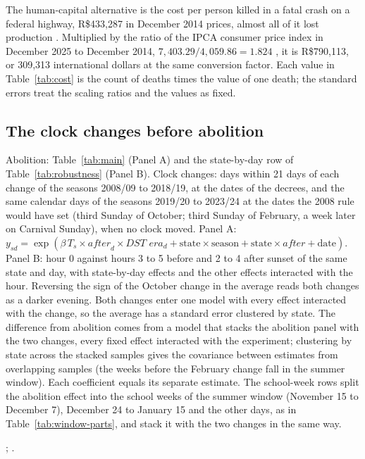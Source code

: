 The human-capital alternative is the cost per person killed in a fatal crash on a federal highway, R\$433,287 in December 2014 prices, almost all of it lost production \citep[Table 6A]{ipea2015acidentes}. Multiplied by the ratio of the IPCA consumer price index in December 2025 to December 2014, $7{,}403.29/4{,}059.86 = 1.824$ \citep{ibge2026ipca}, it is R\$790,113, or 309,313 international dollars at the same conversion factor. Each value in Table~\ref{tab:cost} is the count of deaths times the value of one death; the standard errors treat the scaling ratios and the values as fixed.

\subsection{The clock changes before abolition}

\begin{table}[tbp]
  \caption{The Clock Changes before 2019 and Abolition}
  \label{tab:transitions}
  \centering\footnotesize\renewcommand{\arraystretch}{0.9}
  
  \begin{tablenotes}[Notes]
  Abolition: Table~\ref{tab:main} (Panel A) and the state-by-day row of Table~\ref{tab:robustness} (Panel B). Clock changes: days within 21 days of each change of the seasons 2008/09 to 2018/19, at the dates of the decrees, and the same calendar days of the seasons 2019/20 to 2023/24 at the dates the 2008 rule would have set (third Sunday of October; third Sunday of February, a week later on Carnival Sunday), when no clock moved. Panel A: $y_{sd} = \exp(\beta\, T_s \times \textit{after}_d \times \textit{DST era}_d + \text{state} \times \text{season} + \text{state} \times \textit{after} + \text{date})$. Panel B: hour 0 against hours 3 to 5 before and 2 to 4 after sunset of the same state and day, with state-by-day effects and the other effects interacted with the hour. Reversing the sign of the October change in the average reads both changes as a darker evening. Both changes enter one model with every effect interacted with the change, so the average has a standard error clustered by state. The difference from abolition comes from a model that stacks the abolition panel with the two changes, every fixed effect interacted with the experiment; clustering by state across the stacked samples gives the covariance between estimates from overlapping samples (the weeks before the February change fall in the summer window). Each coefficient equals its separate estimate. The school-week rows split the abolition effect into the school weeks of the summer window (November 15 to December 7), December 24 to January 15 and the other days, as in Table~\ref{tab:window-parts}, and stack it with the two changes in the same way.
  \end{tablenotes}
  \begin{tablenotes}[Sources]
  \citet{datasus2025sim}; \citet{prf2025dados}.
  \end{tablenotes}
\end{table}

